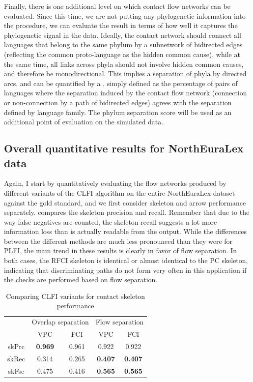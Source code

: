 Finally, there is one additional level on which contact flow networks can be evaluated. Since this time, we are not putting any phylogenetic information into the procedure, we can evaluate the result in terms of how well it captures the phylogenetic signal in the data. Ideally, the contact network should connect all languages that belong to the same phylum by a subnetwork of bidirected edges (reflecting the common proto-language as the hidden common cause), while at the same time, all links across phyla should not involve hidden common causes, and therefore be monodirectional. This implies a separation of phyla by directed arcs, and can be quantified by a \textit{}, simply defined as the percentage of pairs of languages where the separation induced by the contact flow network (connection or non-connection by a path of bidirected edges) agrees with the separation defined by language family. The phylum separation score will be used as an additional point of evaluation on the 
simulated data.

\subsection{Overall quantitative results for NorthEuraLex data}
Again, I start by quantitatively evaluating the flow networks produced by different variants of the CLFI algorithm on the entire NorthEuraLex dataset against the gold standard, and we first consider skeleton and arrow performance separately.  compares the skeleton precision and recall. Remember that due to the way false negatives are counted, the skeleton recall suggests a lot more information loss than is actually readable from the output. While the differences between the different methods are much less pronounced than they were for PLFI, the main trend in these results is clearly in favor of flow separation. In both cases, the RFCI skeleton is identical or almost identical to the PC skeleton, indicating that discriminating paths do not form very often in this application if the checks are performed based on flow separation.

\begin{table}
 \centering
 \begin{tabular}{ccccc}
  \hline \hline
   & \multicolumn{2}{l}{Overlap separation} & \multicolumn{2}{l}{Flow separation}\\ 
   & VPC & FCI & VPC & FCI\\ 
  \hline
  skPrc & \textbf{0.969} & 0.961 & 0.922 & 0.922\\
  skRec & 0.314 & 0.265 & \textbf{0.407} & \textbf{0.407}\\
  skFsc & 0.475 & 0.416 & \textbf{0.565} & \textbf{0.565}\\
  \hline
 \end{tabular}
 \caption{Comparing CLFI variants for contact skeleton performance}
 \label{contact-skeleton-evaluation-nelex}
\end{table}

